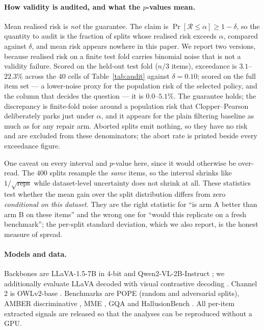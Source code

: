 \documentclass[review,number,doubleblind]{elsarticle}
\theoremstyle{plain}
\theoremstyle{definition}
\theoremstyle{remark}
\newcommand{\Risk}{\mathcal{R}}
\begin{document}
\paragraph{How validity is audited, and what the $p$-values mean.}
Mean realised risk is \emph{not} the guarantee. The claim is
$\Pr[\Risk\le\alpha]\ge1-\delta$, so the quantity to audit is the fraction of splits whose
realised risk exceeds $\alpha$, compared against $\delta$, and mean risk appears nowhere in
this paper. We report two versions, because realised risk on a finite test fold carries
binomial noise that is not a validity failure. Scored on the held-out test fold ($n/3$ items),
exceedance is $3.1$--$22.3\%$ across the $40$ cells of Table~\ref{tab:audit} against
$\delta=0.10$; scored on the full item set --- a lower-noise proxy for the population risk of
the selected policy, and the column that decides the question --- it is $0.0$--$5.1\%$. The
guarantee holds; the discrepancy is finite-fold noise around a population risk that
Clopper--Pearson deliberately parks just under $\alpha$, and it appears for the plain filtering
baseline as much as for any repair arm. Aborted splits emit nothing, so they have no risk and
are excluded from these denominators; the abort rate is printed beside every exceedance figure.

One caveat on every interval and $p$-value here, since it would otherwise be over-read. The
$400$ splits resample the \emph{same} items, so the interval shrinks like
$1/\sqrt{\text{reps}}$ while dataset-level uncertainty does not shrink at all. These statistics
test whether the mean gain over the split distribution differs from zero \emph{conditional on
this dataset}. They are the right statistic for ``is arm A better than arm B on these items''
and the wrong one for ``would this replicate on a fresh benchmark''; the per-split standard
deviation, which we also report, is the honest measure of spread.

\paragraph{Models and data.}
Backbones are LLaVA-1.5-7B \citep{llava} in 4-bit and Qwen2-VL-2B-Instruct \citep{qwenvl};
we additionally evaluate LLaVA decoded with visual contrastive decoding \citep{vcd}.
Channel 2 is OWLv2-base \citep{owlv2}. Benchmarks are POPE \citep{pope} (random and
adversarial splits), AMBER discriminative \citep{amber}, MME \citep{mme}, GQA \citep{gqa}
and HallusionBench \citep{hallusionbench}. All per-item extracted signals are released so
that the analyses can be reproduced without a GPU.
\end{document}
